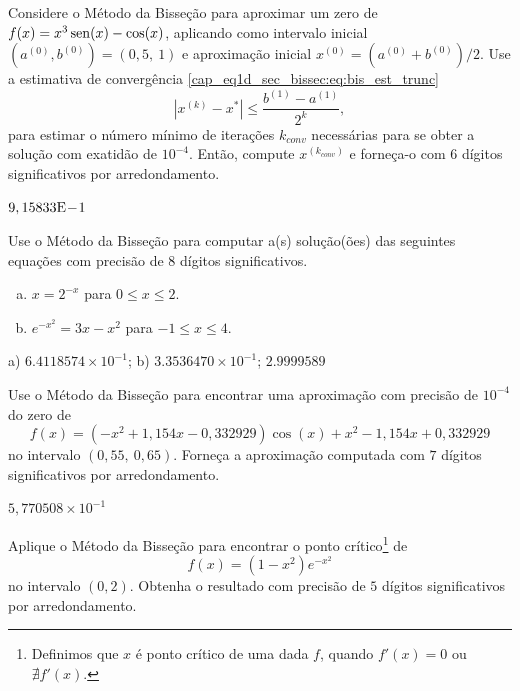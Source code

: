 \begin{exer}
  Considere o Método da Bisseção para aproximar um zero de $f(x)=x^3\operatorname{sen}(x)-\cos(x)$, aplicando como intervalo inicial $(a^{(0)}, b^{(0)}) = (0,5, ~1)$ e aproximação inicial $x^{(0)}=(a^{(0)}+b^{(0)})/2$. Use a estimativa de convergência \eqref{cap_eq1d_sec_bissec:eq:bis_est_trunc}
  \begin{equation}
    \left|x^{(k)} - x^{*}\right| \leq \frac{b^{(1)}-a^{(1)}}{2^k},
  \end{equation}
para estimar o número mínimo de iterações $k_{conv}$ necessárias para se obter a solução com exatidão de $10^{-4}$. Então, compute $x^{(k_{conv})}$ e forneça-o com $6$ dígitos significativos por arredondamento.
\end{exer}
\begin{resp}
  $9,15833\mathrm{E}\!-\!1$
\end{resp}

\begin{exer}
  Use o Método da Bisseção para computar a(s) solução(ões) das seguintes equações com precisão de 8 dígitos significativos.
  \begin{enumerate}[a)]
  \item $x = 2^{-x}$ para $0\leq x \leq 2$.
  \item $e^{-x^2} = 3x - x^2$ para $-1\leq x\leq 4$.
  \end{enumerate}
\end{exer}
\begin{resp}
  a) $6.4118574\times 10^{-1}$; b) $3.3536470\times 10^{-1}$; $2.9999589$
\end{resp}

\begin{exer}
  Use o Método da Bisseção para encontrar uma aproximação com precisão de $10^{-4}$ do zero de
  \begin{equation}
    f(x) = (-x^2+1,154x-0,332929)\cos(x) + x^2 - 1,154x + 0,332929
  \end{equation}
no intervalo $(0,55, ~0,65)$. Forneça a aproximação computada com $7$ dígitos significativos por arredondamento.
\end{exer}
\begin{resp}
  $5,770508\times 10^{-1}$
\end{resp}

\begin{exer}
  Aplique o Método da Bisseção para encontrar o ponto crítico\footnote{Definimos que $x$ é ponto crítico de uma dada $f$, quando $f'(x) = 0$ ou $\nexists f'(x)$.} de
  \begin{equation}
    f(x) = (1-x^2)e^{-x^2}
  \end{equation}
  no intervalo $(0, 2)$. Obtenha o resultado com precisão de $5$ dígitos significativos por arredondamento.
\end{exer}

